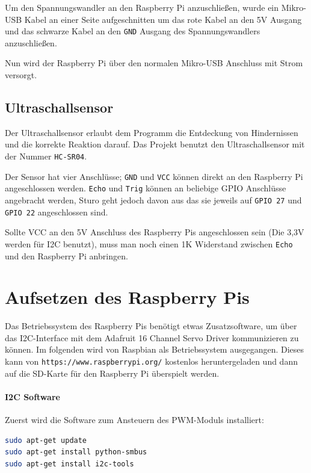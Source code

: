 \documentclass[a4paper,10pt]{scrartcl}
\begin{document}
    Um den Spannungswandler an den Raspberry Pi anzuschließen, wurde ein
    Mikro-USB Kabel an einer Seite aufgeschnitten um das rote Kabel an den 5V
    Ausgang und das schwarze Kabel an den \lstinline{GND} Ausgang des
    Spannungswandlers anzuschließen.

    Nun wird der Raspberry Pi über den normalen Mikro-USB Anschluss mit Strom
    versorgt.

  \subsection{Ultraschallsensor}

    Der Ultraschallsensor erlaubt dem Programm die Entdeckung von Hindernissen
    und die korrekte Reaktion darauf.
    Das Projekt benutzt den Ultraschallsensor mit der Nummer
    \lstinline{HC-SR04}.

    Der Sensor hat vier Anschlüsse;
    \lstinline{GND} und \lstinline{VCC} können direkt an den Raspberry Pi
    angeschlossen werden.
    \lstinline{Echo} und \lstinline{Trig} können an beliebige GPIO Anschlüsse
    angebracht werden, Sturo geht jedoch davon aus das sie jeweils auf
    \lstinline{GPIO 27} und \lstinline{GPIO 22} angeschlossen sind.

    Sollte VCC an den 5V Anschluss des Raspberry Pis angeschlossen sein
    (Die 3,3V werden für I2C benutzt), muss man noch einen 1K Widerstand
    zwischen \lstinline{Echo} und den Raspberry Pi anbringen.

\section{Aufsetzen des Raspberry Pis}

  Das Betriebssystem des Raspberry Pis benötigt etwas Zusatzsoftware, um über
  das I2C-Interface mit dem Adafruit 16 Channel Servo Driver kommunizieren zu
  können.
  Im folgenden wird von Raspbian als Betriebssystem ausgegangen.
  Dieses kann von \lstinline{https://www.raspberrypi.org/} kostenlos
  heruntergeladen und dann auf die SD-Karte für den Raspberry Pi überspielt
  werden.

  \paragraph{I2C Software} Zuerst wird die Software zum Ansteuern des PWM-Moduls
  installiert:
    \begin{lstlisting}[language=sh]
sudo apt-get update
sudo apt-get install python-smbus
sudo apt-get install i2c-tools
    \end{lstlisting}
\end{document}
